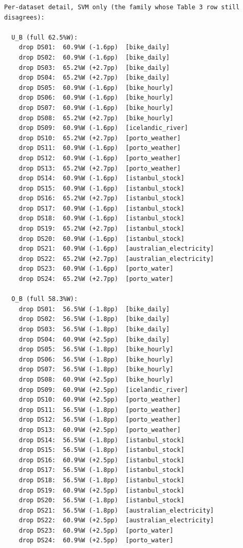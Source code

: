 \begin{verbatim}
Per-dataset detail, SVM only (the family whose Table 3 row still disagrees):

  U_B (full 62.5%W):
    drop DS01:  60.9%W (-1.6pp)  [bike_daily]
    drop DS02:  60.9%W (-1.6pp)  [bike_daily]
    drop DS03:  65.2%W (+2.7pp)  [bike_daily]
    drop DS04:  65.2%W (+2.7pp)  [bike_daily]
    drop DS05:  60.9%W (-1.6pp)  [bike_hourly]
    drop DS06:  60.9%W (-1.6pp)  [bike_hourly]
    drop DS07:  60.9%W (-1.6pp)  [bike_hourly]
    drop DS08:  65.2%W (+2.7pp)  [bike_hourly]
    drop DS09:  60.9%W (-1.6pp)  [icelandic_river]
    drop DS10:  65.2%W (+2.7pp)  [porto_weather]
    drop DS11:  60.9%W (-1.6pp)  [porto_weather]
    drop DS12:  60.9%W (-1.6pp)  [porto_weather]
    drop DS13:  65.2%W (+2.7pp)  [porto_weather]
    drop DS14:  60.9%W (-1.6pp)  [istanbul_stock]
    drop DS15:  60.9%W (-1.6pp)  [istanbul_stock]
    drop DS16:  65.2%W (+2.7pp)  [istanbul_stock]
    drop DS17:  60.9%W (-1.6pp)  [istanbul_stock]
    drop DS18:  60.9%W (-1.6pp)  [istanbul_stock]
    drop DS19:  65.2%W (+2.7pp)  [istanbul_stock]
    drop DS20:  60.9%W (-1.6pp)  [istanbul_stock]
    drop DS21:  60.9%W (-1.6pp)  [australian_electricity]
    drop DS22:  65.2%W (+2.7pp)  [australian_electricity]
    drop DS23:  60.9%W (-1.6pp)  [porto_water]
    drop DS24:  65.2%W (+2.7pp)  [porto_water]

  O_B (full 58.3%W):
    drop DS01:  56.5%W (-1.8pp)  [bike_daily]
    drop DS02:  56.5%W (-1.8pp)  [bike_daily]
    drop DS03:  56.5%W (-1.8pp)  [bike_daily]
    drop DS04:  60.9%W (+2.5pp)  [bike_daily]
    drop DS05:  56.5%W (-1.8pp)  [bike_hourly]
    drop DS06:  56.5%W (-1.8pp)  [bike_hourly]
    drop DS07:  56.5%W (-1.8pp)  [bike_hourly]
    drop DS08:  60.9%W (+2.5pp)  [bike_hourly]
    drop DS09:  60.9%W (+2.5pp)  [icelandic_river]
    drop DS10:  60.9%W (+2.5pp)  [porto_weather]
    drop DS11:  56.5%W (-1.8pp)  [porto_weather]
    drop DS12:  56.5%W (-1.8pp)  [porto_weather]
    drop DS13:  60.9%W (+2.5pp)  [porto_weather]
    drop DS14:  56.5%W (-1.8pp)  [istanbul_stock]
    drop DS15:  56.5%W (-1.8pp)  [istanbul_stock]
    drop DS16:  60.9%W (+2.5pp)  [istanbul_stock]
    drop DS17:  56.5%W (-1.8pp)  [istanbul_stock]
    drop DS18:  56.5%W (-1.8pp)  [istanbul_stock]
    drop DS19:  60.9%W (+2.5pp)  [istanbul_stock]
    drop DS20:  56.5%W (-1.8pp)  [istanbul_stock]
    drop DS21:  56.5%W (-1.8pp)  [australian_electricity]
    drop DS22:  60.9%W (+2.5pp)  [australian_electricity]
    drop DS23:  60.9%W (+2.5pp)  [porto_water]
    drop DS24:  60.9%W (+2.5pp)  [porto_water]


\end{verbatim}
